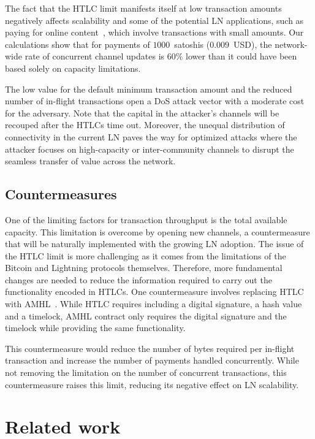 The fact that the HTLC limit manifests itself at low transaction amounts negatively affects scalability and some of the potential LN applications, such as paying for online content~\cite{poon2016bitcoin}, which involve transactions with small amounts.  
Our calculations show that for payments of $1000$~satoshis ($0.009$~USD),
the network-wide rate of concurrent channel updates is $60\%$ lower 
than it could have been based solely on capacity limitations.

The low value for the default minimum transaction amount and the reduced number of in-flight transactions  
open a DoS attack vector with a moderate cost for the adversary.
Note that the capital in the attacker's channels will be recouped after the HTLCs time out.
Moreover, the unequal distribution of connectivity in the current LN paves the way for optimized attacks 
where the attacker focuses on high-capacity or inter-community channels to disrupt the 
seamless transfer of value across the network.


\subsection{Countermeasures}
One of the limiting factors for transaction throughput is the total available capacity.
This limitation is overcome by opening new channels, 
a countermeasure that will be naturally implemented with the growing LN adoption. 
The issue of the HTLC limit is more challenging as it comes from the limitations of the Bitcoin and Lightning protocols themselves.
Therefore, more fundamental changes are needed to reduce the information required to  
carry out the functionality encoded in HTLCs.
One countermeasure involves replacing HTLC with AMHL~\cite{Malavolta2019}. 
While HTLC requires including a digital signature, a hash value and a timelock, AMHL contract only requires the digital signature and the timelock while providing the same functionality. 

This countermeasure would reduce the number of bytes required per in-flight transaction 
and increase the number of payments handled concurrently.
While not removing the limitation on the number of concurrent transactions, 
this countermeasure raises this limit, reducing its negative effect on LN scalability.

\section{Related work}

